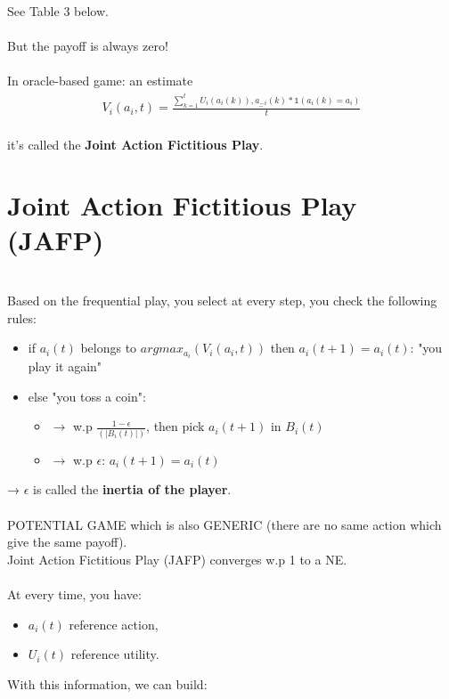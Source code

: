 See Table 3 below.\\
\\
But the payoff is always zero!\\
\\
In oracle-based game: an estimate\\
\begin{equation}\label{eq:14}
\begin{aligned}
V_i(a_i, t) = \frac{\sum_{k = 1}^t U_i(a_i(k)), \underset{-}{a_{-i}}(k) * \mathbb{1}(a_i(k) = a_i)}{t}
\end{aligned}
\end{equation}\\
it's called the \textbf{Joint Action Fictitious Play}.\\
\section{Joint Action Fictitious Play (JAFP)}\\
Based on the frequential play, you select at every step, you check the following rules: \\
\begin{itemize}
\item if $a_i(t)$ belongs to $argmax_{a_i}(V_i(a_i, t))$ then $a_i(t + 1) = a_i(t)$: "you play it again"
\item else "you toss a coin":
    \begin{itemize}
        \item $\rightarrow$ w.p $\frac{1 - \epsilon}{(|B_i(t)|)}$, then pick $a_i(t + 1)$ in $B_i(t)$
	    \item $\rightarrow$ w.p $\epsilon$: $a_i(t + 1) = a_i(t)$
    \end{itemize}
\end{itemize}
→ $\epsilon$ is called the \textbf{inertia of the player}.\\
\\
POTENTIAL GAME which is also GENERIC (there are no same action which give the same payoff).\\
Joint Action Fictitious Play (JAFP) converges w.p 1 to a NE.\\
\\
At every time, you have:
\begin{itemize}
    \item $a_i(t)$ reference action,
    \item $U_i(t)$ reference utility.
\end{itemize}
With this information, we can build:\\
